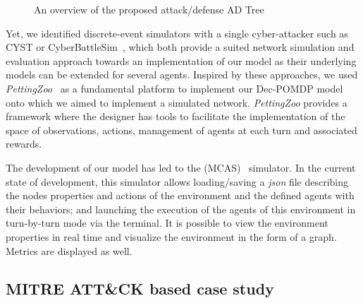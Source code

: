 \begin{figure}
    \centering
    
    \caption{An overview of the proposed attack/defense AD Tree}
    \label{fig:ADTree}
\end{figure}

Yet, we identified discrete-event simulators with a single cyber-attacker such as CYST\cite{drasar_session-level_2020} or CyberBattleSim~\cite{cyberbattlesim}, which both provide a suited network simulation and evaluation approach towards an implementation of our model as their underlying models can be extended for several agents. Inspired by these approaches, we used \textit{PettingZoo}~\cite{jk2020} as a fundamental platform to implement our Dec-POMDP model onto which we aimed to implement a simulated network. \textit{PettingZoo} provides a framework where the designer has tools to facilitate the implementation of the space of observations, actions, management of agents at each turn and associated rewards.


The development of our model has led to the  (MCAS)~\cite{MCASWebsite} simulator. In the current state of development, this simulator allows loading/saving a \textit{json} file describing the nodes properties and actions of the environment and the defined agents with their behaviors; and launching the execution of the agents of this environment in turn-by-turn mode via the terminal. It is possible to view the environment properties in real time and visualize the environment in the form of a graph. Metrics are displayed as well.



\subsection{MITRE ATT\&CK based case study}


